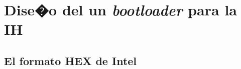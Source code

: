 \chapter{Dise�o del un \textsl{bootloader} para la \acs{IH}}
\label{sec:boot}

\section{El formato HEX de Intel}
\label{sec:boot.hex}



